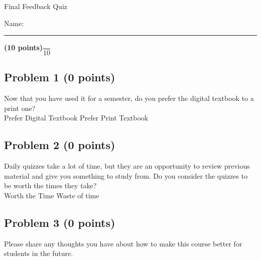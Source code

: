 \documentclass[12pt, letterpaper]{memoir}
\begin{document}
	\begin{center}
		{\large Final Feedback Quiz}
	\end{center}
	{\large Name: \rule[-1mm]{4in}{.1pt} {\bfseries (10 points)}\hspace{4em}$\dfrac{~}{10}$} 
	
	\subsection*{Problem 1 (0 points)}
	Now that you have used it for a semester, do you prefer the digital textbook to a print one? \\
	
	{\large Prefer Digital Textbook \hspace{3em} Prefer Print Textbook}
	
	\vspace{3em}
	\subsection*{Problem 2 (0 points)}
	Daily quizzes take a lot of time, but they are an opportunity to review previous material and give you something to study from. Do you consider the quizzes to be worth the times they take? \\
	
	{\large Worth the Time \hspace{3em} Waste of time}
	
	\vspace{3em}
	\subsection*{Problem 3 (0 points)}
	Please share any thoughts you have about how to make this course better for students in the future.
\end{document}
